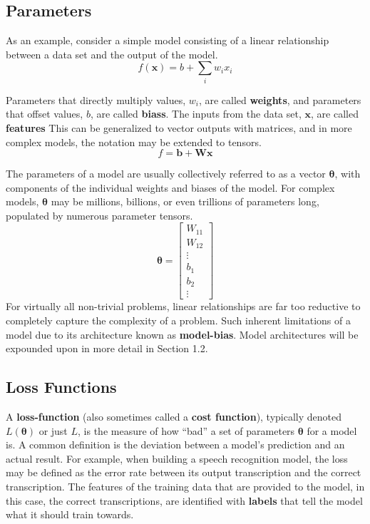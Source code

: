 \documentclass[12pt]{report}
\theoremstyle{definition}
\theoremstyle{remark}
\begin{document}
\subsection{Parameters}

As an example, consider a simple model consisting of a linear relationship between a data set and the output of the model.
\begin{equation}
    f(\mathbf{x}) = b +\sum_i w_i x_i
\end{equation}

Parameters that directly multiply values, $w_i$, are called \textbf{\glspl{weight}}, and parameters that offset values, $b$, are called \textbf{\glspl{bias}}. The inputs from the data set, $\mathbf{x}$, are called \textbf{\glspl{feature}} This can be generalized to vector outputs with matrices, and in more complex models, the notation may be extended to tensors.
\begin{equation}
    f = \mathbf{b} + \mathbf{W}\mathbf{x}
\end{equation}

The parameters of a model are usually collectively referred to as a vector $\boldsymbol{\theta}$, with components of the individual weights and biases of the model. For complex models, $\boldsymbol{\theta}$ may be millions, billions, or even trillions of parameters long, populated by numerous parameter tensors.
\begin{equation}
    \boldsymbol{\theta} = \begin{bmatrix}
        W_{11} \\
        W_{12} \\
        \vdots \\
        b_1 \\
        b_2 \\
        \vdots
    \end{bmatrix}
\end{equation}
For virtually all non-trivial problems, linear relationships are far too reductive to completely capture the complexity of a problem. Such inherent limitations of a model due to its architecture known as \textbf{\gls{model-bias}}. Model architectures will be expounded upon in more detail in Section 1.2.

\subsection{Loss Functions}

A \textbf{\gls{loss-function}} (also sometimes called a \textbf{cost function}), typically denoted $L(\boldsymbol{\theta})$ or just $L$, is the measure of how ``bad'' a set of parameters $\boldsymbol{\theta}$ for a model is. A common definition is the deviation between a model's prediction and an actual result. For example, when building a speech recognition model, the loss may be defined as the error rate between its output transcription and the correct transcription. The features of the training data that are provided to the model, in this case, the correct transcriptions, are identified with \textbf{\glspl{label}} that tell the model what it should train towards.
\end{document}
